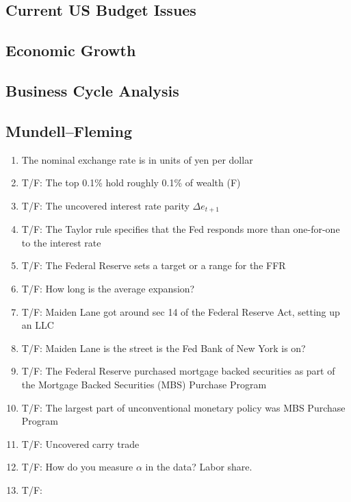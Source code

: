 \documentclass[11pt]{article}
\begin{document}
\subsection{Current US Budget Issues}
\label{sec-7-1}
\subsection{Economic Growth}
\label{sec-7-2}
\subsection{Business Cycle Analysis}
\label{sec-7-3}
\subsection{Mundell--Fleming}
\label{sec-7-4}
\begin{enumerate}
\item The nominal exchange rate is in units of yen per dollar
\label{sec-7-4-1}
\item T/F: The top 0.1\% hold roughly 0.1\% of wealth (F)
\label{sec-7-4-2}
\item T/F: The uncovered interest rate parity $\Delta e_{t+1}$
\label{sec-7-4-3}
\item T/F: The Taylor rule specifies that the Fed responds more than one-for-one to the interest rate
\label{sec-7-4-4}
\item T/F: The Federal Reserve sets a target or a range for the FFR
\label{sec-7-4-5}
\item T/F: How long is the average expansion?
\label{sec-7-4-6}
\item T/F: Maiden Lane got around sec 14 of the Federal Reserve Act, setting up an LLC
\label{sec-7-4-7}
\item T/F: Maiden Lane is the street is the Fed Bank of New York is on?
\label{sec-7-4-8}
\item T/F: The Federal Reserve purchased mortgage backed securities as part of the Mortgage Backed Securities (MBS) Purchase Program
\label{sec-7-4-9}
\item T/F: The largest part of unconventional monetary policy was MBS Purchase Program
\label{sec-7-4-10}
\item T/F: Uncovered carry trade
\label{sec-7-4-11}
\item T/F: How do you measure $\alpha$ in the data? Labor share.
\label{sec-7-4-12}
\item T/F:
\label{sec-7-4-13}
\end{enumerate}
\end{document}
